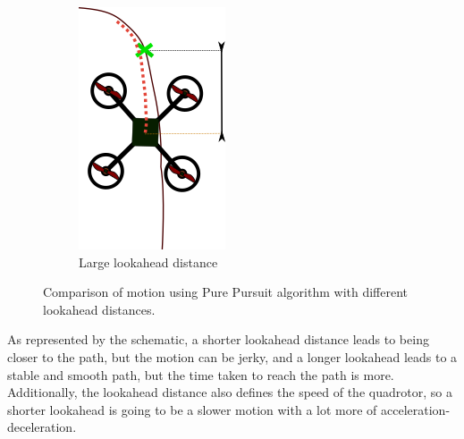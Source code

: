 \documentclass[hidelinks,BTech]{iitmdiss}
\begin{document}
\begin{figure}[H]
\begin{subfigure}[t]{0.3\textwidth}
      \includegraphics[width=\textwidth]{Pure_Pursuit_long.png}
      \caption{Large lookahead distance}
  \end{subfigure}
  \caption{Comparison of motion using Pure Pursuit algorithm with different lookahead distances.}
\end{figure}

As represented by the schematic, a shorter lookahead distance leads to being closer to the path, but the motion can be jerky, and a longer lookahead leads to a stable and smooth path, but the time taken to reach the path is more. Additionally, the lookahead distance also defines the speed of the quadrotor, so a shorter lookahead is going to be a slower motion with a lot more of acceleration-deceleration.
\end{document}
